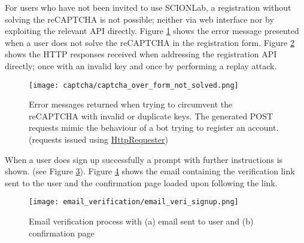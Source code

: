  For users who have not been invited to use SCIONLab, a registration without solving the reCAPTCHA is not possible; neither via web interface nor by exploiting the relevant API directly. Figure \ref{veri:capt_not_solved} shows the error message presented when a user does not solve the reCAPTCHA in the registration form. Figure \ref{capt:invalid_key} shows the HTTP responses received when addressing the registration API directly; once with an invalid key and once by performing a replay attack.

\begin{figure}[h] %
	\centering
	\texttt{[image: captcha/captcha\_over\_form\_not\_solved.png]}
	\label{veri:capt_not_solved}
\end{figure}

\begin{figure}%
	\centering
	\caption{Error messages returned when trying to circumvent the reCAPTCHA with invalid or duplicate keys. The generated POST requests mimic the behaviour of a bot trying to register an account. (requests issued using \href{https://addons.mozilla.org/de/firefox/addon/httprequester/}{HttpRequester})}%
	\label{capt:invalid_key}%
\end{figure}

When a user does sign up successfully a prompt with further instructions is shown. (see Figure \ref{veri:registration_success}). Figure \ref{veri:success_and_email} shows the email containing the verification link sent to the user and the confirmation page loaded upon following the link.

\begin{figure}[h] %
	\centering
	\texttt{[image: email\_verification/email\_veri\_signup.png]}
	\label{veri:registration_success}
\end{figure}

\begin{figure}[h]%
	\centering
	\par
	\caption{Email verification process with (a) email sent to user and (b) confirmation page}%
	\label{veri:success_and_email}%
\end{figure}

